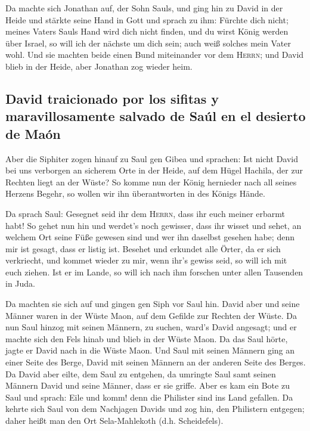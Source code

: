  Da machte sich Jonathan auf, der Sohn Sauls, und ging
hin zu David in der Heide und stärkte seine Hand in Gott 
und sprach zu ihm: Fürchte dich nicht; meines Vaters Sauls Hand wird
dich nicht finden, und du wirst König werden über Israel, so will ich
der nächste um dich sein; auch weiß solches mein Vater wohl.
 Und sie machten beide einen Bund miteinander vor dem
\textsc{Herrn}; und David blieb in der Heide, aber Jonathan zog wieder
heim.

\hypertarget{david-traicionado-por-los-sifitas-y-maravillosamente-salvado-de-sauxfal-en-el-desierto-de-mauxf3n}{%
\subsection{David traicionado por los sifitas y maravillosamente salvado
de Saúl en el desierto de
Maón}\label{david-traicionado-por-los-sifitas-y-maravillosamente-salvado-de-sauxfal-en-el-desierto-de-mauxf3n}}

 Aber die Siphiter zogen hinauf zu Saul gen Gibea und
sprachen: Ist nicht David bei uns verborgen an sicherem Orte in der
Heide, auf dem Hügel Hachila, der zur Rechten liegt an der Wüste?
 So komme nun der König hernieder nach all seines Herzens
Begehr, so wollen wir ihn überantworten in des Königs Hände.

 Da sprach Saul: Gesegnet seid ihr dem \textsc{Herrn},
dass ihr euch meiner erbarmt habt!  So gehet nun hin und
werdet's noch gewisser, dass ihr wisset und sehet, an welchem Ort seine
Füße gewesen sind und wer ihn daselbst gesehen habe; denn mir ist
gesagt, dass er listig ist.  Besehet und erkundet alle
Örter, da er sich verkriecht, und kommet wieder zu mir, wenn ihr's
gewiss seid, so will ich mit euch ziehen. Ist er im Lande, so will ich
nach ihm forschen unter allen Tausenden in Juda.

 Da machten sie sich auf und gingen gen Siph vor Saul
hin. David aber und seine Männer waren in der Wüste Maon, auf dem
Gefilde zur Rechten der Wüste.  Da nun Saul hinzog mit
seinen Männern, zu suchen, ward's David angesagt; und er machte sich den
Fels hinab und blieb in der Wüste Maon. Da das Saul hörte, jagte er
David nach in die Wüste Maon.  Und Saul mit seinen
Männern ging an einer Seite des Berge, David mit seinen Männern an der
anderen Seite des Berges. Da David aber eilte, dem Saul zu entgehen, da
umringte Saul samt seinen Männern David und seine Männer, dass er sie
griffe.  Aber es kam ein Bote zu Saul und sprach: Eile
und komm! denn die Philister sind ins Land gefallen.  Da
kehrte sich Saul von dem Nachjagen Davids und zog hin, den Philistern
entgegen; daher heißt man den Ort Sela-Mahlekoth (d.h. Scheidefels).


